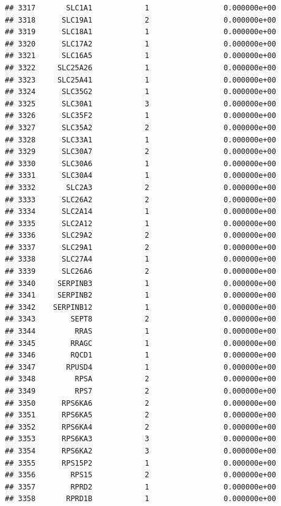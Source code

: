 \documentclass[
]{article}
\begin{document}
\begin{verbatim}
## 3317       SLC1A1            1                 0.000000e+00
## 3318      SLC19A1            2                 0.000000e+00
## 3319      SLC18A1            1                 0.000000e+00
## 3320      SLC17A2            1                 0.000000e+00
## 3321      SLC16A5            1                 0.000000e+00
## 3322     SLC25A26            1                 0.000000e+00
## 3323     SLC25A41            1                 0.000000e+00
## 3324      SLC35G2            1                 0.000000e+00
## 3325      SLC30A1            3                 0.000000e+00
## 3326      SLC35F2            1                 0.000000e+00
## 3327      SLC35A2            2                 0.000000e+00
## 3328      SLC33A1            1                 0.000000e+00
## 3329      SLC30A7            2                 0.000000e+00
## 3330      SLC30A6            1                 0.000000e+00
## 3331      SLC30A4            1                 0.000000e+00
## 3332       SLC2A3            2                 0.000000e+00
## 3333      SLC26A2            2                 0.000000e+00
## 3334      SLC2A14            1                 0.000000e+00
## 3335      SLC2A12            1                 0.000000e+00
## 3336      SLC29A2            2                 0.000000e+00
## 3337      SLC29A1            2                 0.000000e+00
## 3338      SLC27A4            1                 0.000000e+00
## 3339      SLC26A6            2                 0.000000e+00
## 3340     SERPINB3            1                 0.000000e+00
## 3341     SERPINB2            1                 0.000000e+00
## 3342    SERPINB12            1                 0.000000e+00
## 3343        SEPT8            2                 0.000000e+00
## 3344         RRAS            1                 0.000000e+00
## 3345        RRAGC            1                 0.000000e+00
## 3346        RQCD1            1                 0.000000e+00
## 3347       RPUSD4            1                 0.000000e+00
## 3348         RPSA            2                 0.000000e+00
## 3349         RPS7            2                 0.000000e+00
## 3350      RPS6KA6            2                 0.000000e+00
## 3351      RPS6KA5            2                 0.000000e+00
## 3352      RPS6KA4            2                 0.000000e+00
## 3353      RPS6KA3            3                 0.000000e+00
## 3354      RPS6KA2            3                 0.000000e+00
## 3355      RPS15P2            1                 0.000000e+00
## 3356        RPS15            2                 0.000000e+00
## 3357        RPRD2            1                 0.000000e+00
## 3358       RPRD1B            1                 0.000000e+00

\end{verbatim}
\end{document}
